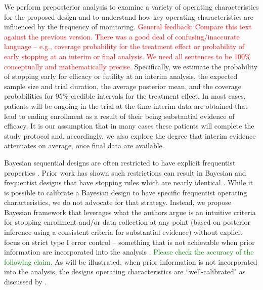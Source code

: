\documentclass[useAMS,usenatbib,referee]{biom}
\begin{document}
We perform preposterior analysis to examine a variety of operating characteristics for the proposed design
and to understand how key operating characteristics are influenced by the frequency of monitoring.
\textcolor{red}{General feedback: Compare this text against the previous version. There was a good deal of 
confusing/inaccurate language -- e.g.,  coverage probability for the treatment effect or probability of early stopping
at an interim or final analysis. We need all sentences to be 100\% conceptually and mathematically precise.}
Specifically, we estimate the probability of stopping early for efficacy or futility at an interim analysis, 
the expected sample size and trial duration, the average posterior mean, and the coverage probabilities for 
95\% credible intervals for the treatment effect. 
In most cases, patients will be ongoing in the trial at the time interim data are obtained that lead to 
ending enrollment as a result of their being substantial evidence of efficacy. 
It is our assumption that in many cases these patients will complete the study protocol and, accordingly, we also explore 
the degree that interim evidence attenuates on average, once final data are available.	

Bayesian sequential designs are often restricted to have explicit frequentist properties \citep{Ventz2015, Zhu2015}. 
Prior work has shown such restrictions can result in Bayesian and frequentist designs that have stopping rules which are 
nearly identical \citep{Stallard2020, Kopp-Schneider2019, Zhu2019}.
While it is possible to calibrate a Bayesian design to have specific frequentist operating characteristics, we do not advocate
for that strategy.
Instead, we propose Bayesian framework that leverages what the authors argue is an intuitive criteria for stopping enrollment 
and/or data collection at any point (based on posterior inference using a consistent criteria for substantial evidence) without 
explicit focus on strict type I error control -- something that is not achievable when prior information are incorporated into 
the analysis \citep{Psioda2018}.
\textcolor{green}{Please check the accuracy of the following claim.}
As will be illustrated, when prior information is not incorporated into the analysis, the designs operating characteristics 
are ``well-calibrated" as discussed by \cite{Grieve2016}. 
\end{document}
